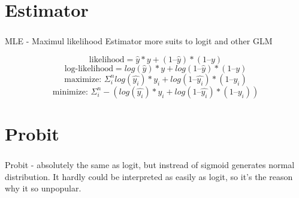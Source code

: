 \documentclass[t, 11pt]{beamer}
\begin{document}
	\section{Estimator}
\begin{frame} 
	\frametitle{\insertsection} 
	MLE  - Maximul likelihood Estimator more suits to logit and other GLM
	\begin{center}
		\begin{equation}
			\text{likelihood} = \hat{y} * y + (1 – \hat{y}) * (1 – y)
		\end{equation}
		\begin{equation}
		\text{log-likelihood} = log(\hat{y}) * y + log(1 – \hat{y}) * (1 – y)
	\end{equation}
		\begin{equation}
	\text{maximize: } \Sigma^n_i  log(\hat{y_i}) * y_i + log(1 – \hat{y_i}) * (1 – y_i)
\end{equation}
		\begin{equation}
	\text{minimize: } \Sigma^n_i  -(log(\hat{y_i}) * y_i + log(1 – \hat{y_i}) * (1 – y_i))
\end{equation}


\end{center}

\end{frame}	

	\section{Probit}
\begin{frame} 
	\frametitle{\insertsection} 
 Probit - absolutely the same as logit, but instread of sigmoid generates normal distribution. It  hardly could be interpreted as easily as logit, so it's the reason why it so unpopular. 


	
\end{frame}	
\end{document}
